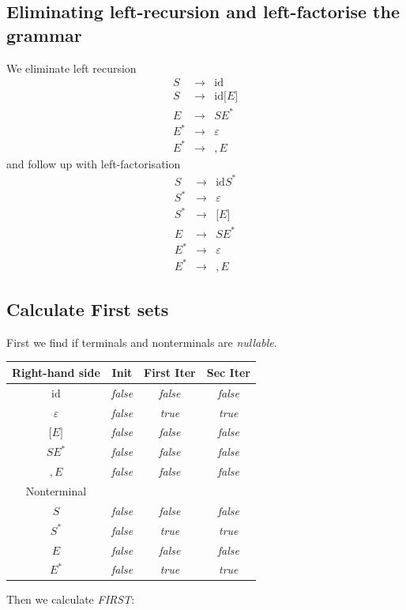 \documentclass[11pt,a4paper]{article}
\begin{document}
\subsection{Eliminating left-recursion and left-factorise the grammar}
We eliminate left recursion
$$
\begin{array}{lcl}
    S & \rightarrow & \mathrm{id}\\
    S & \rightarrow & \mathrm{id[} E \mathrm{]}\\
    E & \rightarrow & SE^{*}\\
    E^{*} & \rightarrow & \varepsilon\\
    E^{*} & \rightarrow & \mathrm{,}E
\end{array}
$$
and follow up with left-factorisation
$$
\begin{array}{lcl}
    S & \rightarrow & \mathrm{id}S^{*}\\
    S^{*} & \rightarrow & \varepsilon\\
    S^{*} & \rightarrow & \mathrm{[} E \mathrm{]}\\
    E & \rightarrow & SE^{*}\\
    E^{*} & \rightarrow & \varepsilon\\
    E^{*} & \rightarrow & \mathrm{,}E
\end{array}
$$
\subsection{Calculate First sets}

First we find if terminals and nonterminals are \emph{nullable}.
\begin{center}
\begin{tabular}{c||c|c|c}
Right-hand side & Init & First Iter & Sec Iter\tabularnewline
\hline 
\hline 
$\mathrm{id}$ & \emph{false} & \emph{false} & \emph{false}\tabularnewline
\hline 
$\varepsilon$ & \emph{false} & \emph{true} & \emph{true}\tabularnewline
\hline 
$[E\mathrm{\mathrm{]}}$ & \emph{false} & \emph{false} & \emph{false}\tabularnewline
\hline 
$SE^{*}$ & \emph{false} & \emph{false} & \emph{false}\tabularnewline
\hline 
$\mathrm{,}E$ & \emph{false} & \emph{false} & \emph{false}\tabularnewline
\hline 
Nonterminal & \multicolumn{1}{c}{} & \multicolumn{1}{c}{} & \tabularnewline
\hline 
$S$ & \emph{false} & \emph{false} & \emph{false}\tabularnewline
\hline 
$S^{*}$ & \emph{false} & \emph{true} & \emph{true}\tabularnewline
\hline 
$E$ & \emph{false} & \emph{false} & \emph{false}\tabularnewline
\hline 
$E^{*}$ & \emph{false} & \emph{true} & \emph{true}\tabularnewline
\end{tabular}
\end{center}
Then we calculate \emph{FIRST}:
\end{document}
